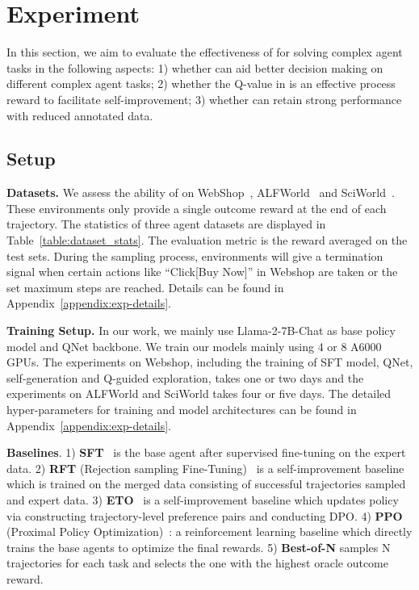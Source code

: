 \section{Experiment}



In this section, we aim to evaluate the effectiveness of {\ours} for solving complex agent tasks in the following aspects:
1) whether {\ours} can aid better decision making on different complex agent tasks;
2) whether the Q-value in {\ours} is an effective process reward to facilitate self-improvement;
3) whether {\ours} can retain strong performance with reduced annotated data.

\subsection{Setup}
\textbf{Datasets.}
We assess the ability of {\ours} on WebShop~\citep{yao2022webshop}, ALFWorld~\citep{shridhar2021alfworld} and SciWorld~\cite{wang2022scienceworld}. These environments only provide a single outcome reward at the end of each trajectory. The statistics of three agent datasets are displayed in Table~\ref{table:dataset_stats}.
The evaluation metric is the reward averaged on the test sets. During the sampling process, environments will give a termination signal when certain actions like ``Click[Buy Now]'' in Webshop are taken or the set maximum steps are reached. Details can be found in Appendix~\ref{appendix:exp-details}.


\textbf{Training Setup.}
In our work, we mainly use Llama-2-7B-Chat as base policy model and QNet backbone. 
We train our models mainly using 4 or 8 A6000 GPUs. The experiments on Webshop, including the training of SFT model, QNet, self-generation and Q-guided exploration, takes one or two days and the experiments on ALFWorld and SciWorld takes four or five days. The detailed hyper-parameters for training and model architectures can be found in Appendix~\ref{appendix:exp-details}.

\textbf{Baselines}.
1) \textbf{SFT}~\citep{chen2023fireact} is the base agent after supervised fine-tuning on the expert data.
2) \textbf{RFT} (Rejection sampling Fine-Tuning)~\citep{yuan2023RFT} is a self-improvement baseline which is trained on the merged data consisting of successful trajectories sampled and expert data. 
3) \textbf{ETO}~\citep{song-etal-2024-eto} is a self-improvement baseline which updates policy via constructing trajectory-level preference pairs and conducting DPO.
4) \textbf{PPO} (Proximal Policy Optimization)~\citep{schulman2017proximal}: a reinforcement learning baseline which directly trains the base agents to optimize the final rewards.
5) \textbf{Best-of-N} samples N trajectories for each task and selects the one with the highest oracle outcome reward. 

